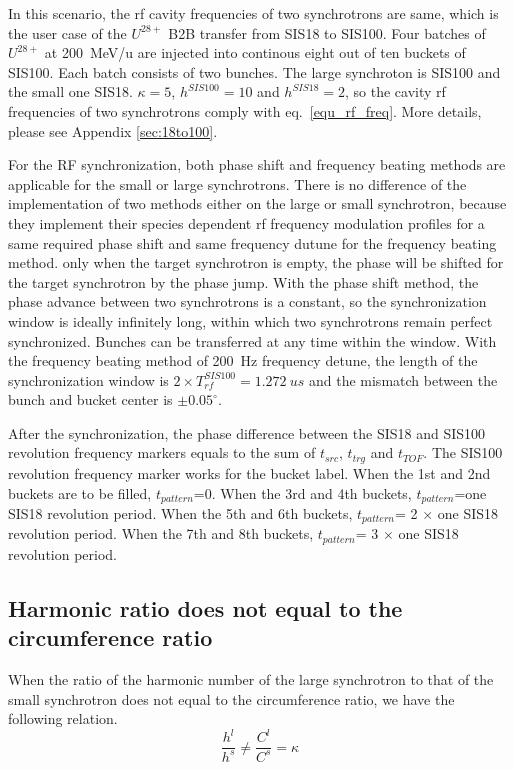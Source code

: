 In this scenario, the rf cavity frequencies of two synchrotrons are same, which is the user case of the $U^{28+}$ B2B transfer from SIS18 to SIS100. Four batches of $U^{28+}$ at \SI{200}{MeV/\atomicmassunit} are injected into continous eight out of ten buckets of SIS100. Each batch consists of two bunches. The large synchroton is SIS100 and the small one SIS18. $\kappa=5$, $h^{SIS100}=10$ and $h^{SIS18}=2$, so the cavity rf frequencies of two synchrotrons comply with eq.~\ref{equ_rf_freq}. More details, please see Appendix \ref{sec:18to100}.

For the RF synchronization, both phase shift and frequency beating methods are applicable for the small or large synchrotrons. There is no difference of the implementation of two methods either on the large or small synchrotron, because they implement their species dependent rf frequency modulation profiles for a same required phase shift and same frequency dutune for the frequency beating method. only when the target synchrotron is empty, the phase will be shifted for the target synchrotron by the phase jump. With the phase shift method, the phase advance between two synchrotrons is a constant, so the synchronization window is ideally infinitely long, within which two synchrotrons remain perfect synchronized. Bunches can be transferred at any time within the window. With the frequency beating method of \SI{200}{Hz} frequency detune, the length of the synchronization window is $2 \times T_{rf}^{SIS100}=\SI{1.272}{us}$ and the mismatch between the bunch and bucket center is $\pm0.05^\circ$.

After the synchronization, the phase difference between the SIS18 and SIS100 revolution frequency markers equals to the sum of $t_{src}$, $t_{trg}$ and $t_{TOF}$. The SIS100 revolution frequency marker works for the bucket label. When the 1st and 2nd buckets are to be filled, $t_{pattern}$=0. When the 3rd and 4th buckets, $t_{pattern}$=one SIS18 revolution period. When the 5th and 6th buckets, $t_{pattern}$= 2 $\times$ one SIS18 revolution period. When the 7th and 8th buckets, $t_{pattern}$= 3 $\times$ one SIS18 revolution period. 

\subsection{Harmonic ratio does not equal to the circumference ratio} 
\label{sec:cir_no_int1}
When the ratio of the harmonic number of the large synchrotron to that of the small synchrotron does not equal to the circumference ratio, we have the following relation.
\begin{equation}
\frac {h^{l}}{h^{s}}\neq \frac {C^{l}}{C^{s}}= \kappa  \label{harmonic_1_noint}
\end{equation}


